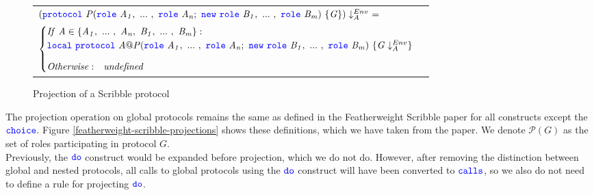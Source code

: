 \documentclass[12pt,twoside]{report}
\begin{document}
\begin{figure}[!h]
    \begin{center}
        \begin{tabular}{l}
            $(\protocol\ \mathit{P}(\rolessig{A}{n};\ \scrnew\ \rolessig{B}{m})\ \{\mathit{G}\})\project\ =$\\[7pt]
            \begin{math}
                \begin{cases}
                    \mathit{If}\ \mathit{A} \in \{\roles{A}{n},\ \roles{B}{m}\}:\\
                    \scrlocal\ \protocol\ \mathit{A@P}(\rolessig{A}{n};\ \scrnew\ \rolessig{B}{m})\ \{\mathit{G} \project\}\\[8pt]
                    \mathit{Otherwise:} \quad \mathit{undefined}
                \end{cases}
            \end{math}
        \end{tabular}
    \end{center}
    \caption{Projection of a Scribble protocol}
    \label{scribble-protocol-projection}
\end{figure}





The projection operation on global protocols remains the same as defined in the Featherweight Scribble paper\cite{featherweight} for all constructs except the ${\color{blue}\mathtt{choice}}$. Figure \ref{featherweight-scribble-projections} shows these definitions, which we have taken from the paper. We denote $\mathcal{P}(G)$ as the set of roles participating in protocol $G$.\\

Previously, the ${\color{blue}\mathtt{do}}$ construct would be expanded before projection, which we do not do. However, after removing the distinction between global and nested protocols, all calls to global protocols using the ${\color{blue}\mathtt{do}}$ construct will have been converted to ${\color{blue}\mathtt{calls}}$, so we also do not need to define a rule for projecting ${\color{blue}\mathtt{do}}$. \\
\end{document}
